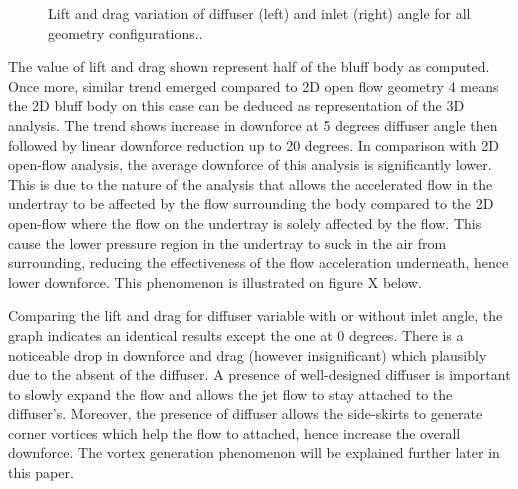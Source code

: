 \begin{figure}[htb!]
    \centering
    \noindent{}
    \caption{Lift and drag variation of diffuser (left) and inlet (right) angle for all geometry configurations..}
    \label{fig:3D_OF_PLOT_COMPARE_ALL}
\end{figure}
\noindent The value of lift and drag shown represent half of the bluff body as computed. Once more, similar trend emerged compared to 2D open flow geometry 4 means the 2D bluff body on this case can be deduced as representation of the 3D analysis.  The trend shows increase in downforce at 5 degrees diffuser angle then followed by linear downforce reduction up to 20 degrees.  In comparison with 2D open-flow analysis, the average downforce of this analysis is significantly lower. This is due to the nature of the analysis that allows the accelerated flow in the undertray to be affected by the flow surrounding the body compared to the 2D open-flow where the flow on the undertray  is solely affected by the flow. This cause the lower pressure region in the undertray to suck in the air from surrounding,  reducing the effectiveness of the flow acceleration underneath, hence lower downforce. This phenomenon is illustrated on figure X below. %

\noindent Comparing the lift and drag for diffuser variable with or without inlet angle, the graph indicates an identical results except the one at 0 degrees.  There is a noticeable drop in downforce and drag (however insignificant) which plausibly due to the absent of the diffuser. A presence of well-designed diffuser is important to slowly expand the flow and allows the jet flow to stay attached to the diffuser's. Moreover, the presence of diffuser allows the side-skirts to generate corner vortices which help the flow to attached, hence increase the overall downforce. The vortex generation phenomenon will be explained further later in this paper. %

